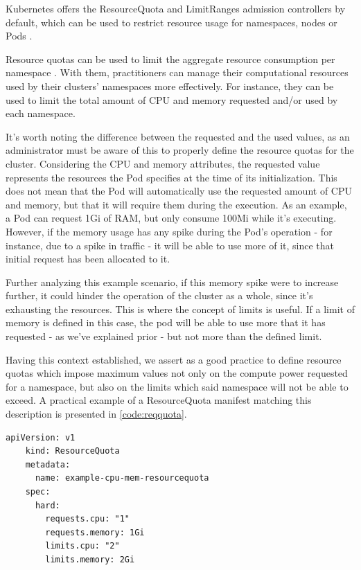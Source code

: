 \documentclass[a4paper,11pt,openright,BCOR=15mm]{scrbook}
\begin{document}
Kubernetes offers the ResourceQuota and LimitRanges admission controllers by default, which can be used to restrict resource usage for namespaces, nodes or Pods \cite{national_security_agency_kubernetes_2022}.

Resource quotas can be used to limit the aggregate resource consumption per namespace \cite{the_linux_foundation_resource_2024}. With them, practitioners can manage their computational resources used by their clusters' namespaces more effectively. For instance, they can be used to limit the total amount of CPU and memory requested and/or used by each namespace.

It's worth noting the difference between the requested and the used values, as an administrator must be aware of this to properly define the resource quotas for the cluster. Considering the CPU and memory attributes, the requested value represents the resources the Pod specifies at the time of its initialization. This does not mean that the Pod will automatically use the requested amount of CPU and memory, but that it will require them during the execution. As an example, a Pod can request 1Gi of RAM, but only consume 100Mi while it's executing. However, if the memory usage has any spike during the Pod's operation - for instance, due to a spike in traffic - it will be able to use more of it, since that initial request has been allocated to it.

Further analyzing this example scenario, if this memory spike were to increase further, it could hinder the operation of the cluster as a whole, since it's exhausting the resources. This is where the concept of limits is useful. If a limit of memory is defined in this case, the pod will be able to use more that it has requested - as we've explained prior - but not more than the defined limit.

Having this context established, we assert as a good practice to define resource quotas which impose maximum values not only on the compute power requested for a namespace, but also on the limits which said namespace will not be able to exceed. A practical example of a ResourceQuota manifest matching this description is presented in \ref{code:reqquota}.

\begin{lstlisting}[style=yaml,caption={ResourceQuota example},label=code:reqquota]
	apiVersion: v1
	kind: ResourceQuota
	metadata:
	  name: example-cpu-mem-resourcequota
	spec:
	  hard:
	    requests.cpu: "1"
		requests.memory: 1Gi
		limits.cpu: "2"
		limits.memory: 2Gi
\end{lstlisting}
\end{document}
